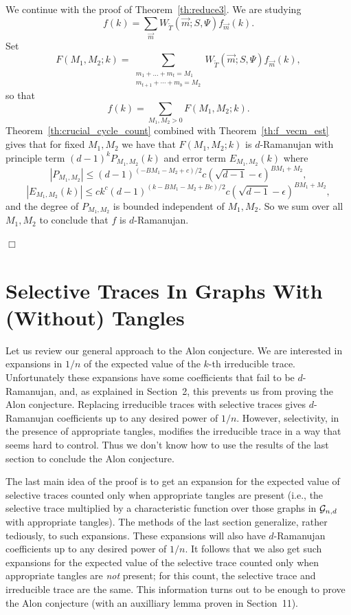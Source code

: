 \documentclass[12pt]{article}
\newcommand{\dtreelike}{{$d$-Ramanujan}}
\newcommand{\cg}{{\cal G}}
\newcommand{\cgnd}{\cg_{n,d}}
\newcommand{\tset}{{\Psi}}
\newcommand{\proofbox}{\begin{flushright}$\Box$\end{flushright}}
\begin{document}
We continue with the proof of Theorem~\ref{th:reduce3}.
We are studying
$$
f(k) = \sum_{\vec m} W_{\widetilde T}(\vec m;S,\tset)f_{\vec m}(k).
$$
Set 
$$
F(M_1,M_2;k) = \sum_{\substack{m_1+\ldots+m_t=M_1\\
\scriptstyle m_{t+1}+\cdots+m_b=M_2}}
W_{\widetilde T}(\vec m;S,\tset)f_{\vec m}(k),
$$
so that
$$
f(k)=\sum_{M_1,M_2>0}
F(M_1,M_2;k).
$$
Theorem~\ref{th:crucial_cycle_count} combined with 
Theorem~\ref{th:f_vecm_est} gives that for fixed $M_1,M_2$ we have
that $F(M_1,M_2;k)$ is {\dtreelike} with principle term
$(d-1)^k P_{M_1,M_2}(k)$ and error term $E_{M_1,M_2}(k)$ where
$$
|P_{M_1,M_2}| \le (d-1)^{(-BM_1-M_2+c)/2}
c (\sqrt{d-1}-\epsilon)^{BM_1+M_2},
$$
$$
|E_{M_1,M_2}(k)| \le
ck^c (d-1)^{(k-BM_1-M_2+Bc)/2}
c (\sqrt{d-1}-\epsilon)^{BM_1+M_2},
$$
and the degree of $P_{M_1,M_2}$ is bounded independent of $M_1,M_2$.
So we sum over all $M_1,M_2$
to conclude that
$f$ is {\dtreelike}.
\proofbox
\section{Selective Traces In Graphs With (Without) Tangles}

Let us review our general approach to the Alon conjecture.
We are interested in expansions in $1/n$
of the expected value of the $k$-th
irreducible trace.  Unfortunately these expansions have some coefficients
that fail to be {\dtreelike}, and, as explained in Section~2, this
prevents us from proving the Alon conjecture.
Replacing irreducible traces with
selective traces gives
{\dtreelike} coefficients up to any desired power of $1/n$.  However,
selectivity, in the presence of appropriate tangles, modifies the
irreducible trace in a way that seems hard to control.  
Thus we don't know how to use the results of the last section to
conclude the Alon conjecture.

The last main
idea of the proof is to get an expansion for the expected value
of selective traces counted only when appropriate tangles are present
(i.e., the selective trace multiplied by a characteristic function
over those graphs in $\cgnd$ with appropriate tangles).
The methods of the last section generalize, rather tediously, to
such expansions.  These expansions will also have 
{\dtreelike} coefficients up to any desired power of $1/n$.
It follows that we also get such expansions for the expected value
of the selective trace counted only when appropriate tangles are
{\em not} present; for this count, the selective trace and irreducible
trace are the same.  This information turns out to be enough to prove
the Alon conjecture (with an auxilliary lemma proven in
Section~11).
\end{document}
